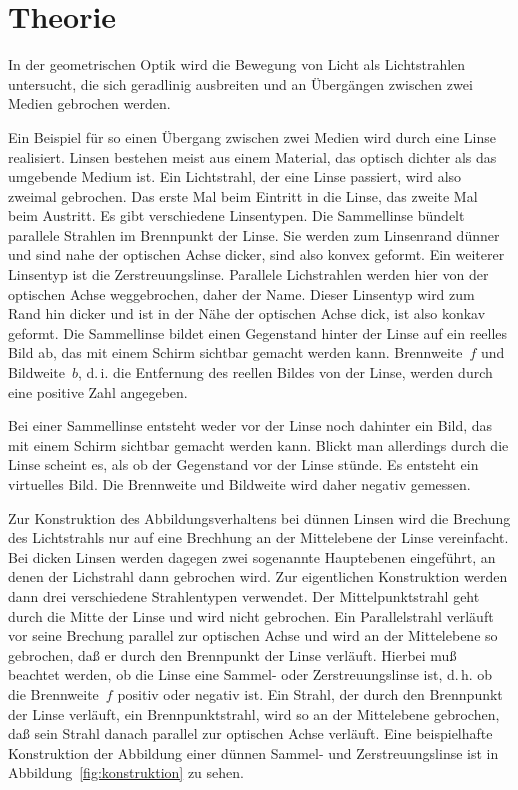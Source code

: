 
\section{Theorie}

In der geometrischen Optik wird die Bewegung von Licht als Lichtstrahlen
untersucht, die sich geradlinig ausbreiten und an Übergängen zwischen
zwei Medien gebrochen werden.

Ein Beispiel für so einen Übergang zwischen zwei Medien wird durch eine
Linse realisiert.  Linsen bestehen meist aus einem Material, das optisch
dichter als das umgebende Medium ist.  Ein Lichtstrahl, der eine Linse
passiert, wird also zweimal gebrochen.  Das erste Mal beim Eintritt in
die Linse, das zweite Mal beim Austritt.  Es gibt verschiedene
Linsentypen.  Die Sammellinse bündelt parallele Strahlen im Brennpunkt
der Linse.  Sie werden zum Linsenrand dünner und sind nahe der optischen
Achse dicker, sind also konvex geformt.  Ein weiterer Linsentyp ist die
Zerstreuungslinse.  Parallele Lichstrahlen werden hier von der optischen
Achse weggebrochen, daher der Name.  Dieser Linsentyp wird zum Rand hin
dicker und ist in der Nähe der optischen Achse dick, ist also konkav
geformt.  Die Sammellinse bildet einen Gegenstand hinter der Linse auf
ein reelles Bild ab, das mit einem Schirm sichtbar gemacht werden
kann. Brennweite~$f$ und Bildweite~$b$, d.\,i. die Entfernung des
reellen Bildes von der Linse, werden durch eine positive Zahl angegeben.

Bei einer Sammellinse entsteht weder vor der Linse noch dahinter ein
Bild, das mit einem Schirm sichtbar gemacht werden kann.  Blickt man
allerdings durch die Linse scheint es, als ob der Gegenstand vor der
Linse stünde.  Es entsteht ein virtuelles Bild.  Die Brennweite und
Bildweite wird daher negativ gemessen.

Zur Konstruktion des Abbildungsverhaltens bei dünnen Linsen wird die
Brechung des Lichtstrahls nur auf eine Brechhung an der Mittelebene der
Linse vereinfacht.  Bei dicken Linsen werden dagegen zwei sogenannte
Hauptebenen eingeführt, an denen der Lichstrahl dann gebrochen wird. Zur
eigentlichen Konstruktion werden dann drei verschiedene Strahlentypen
verwendet.  Der Mittelpunktstrahl geht durch die Mitte der Linse und
wird nicht gebrochen.  Ein Parallelstrahl verläuft vor seine Brechung
parallel zur optischen Achse und wird an der Mittelebene so gebrochen,
daß er durch den Brennpunkt der Linse verläuft. Hierbei muß beachtet
werden, ob die Linse eine Sammel- oder Zerstreuungslinse ist, d.\,h. ob
die Brennweite~$f$ positiv oder negativ ist.  Ein Strahl, der durch den
Brennpunkt der Linse verläuft, ein Brennpunktstrahl, wird so an der
Mittelebene gebrochen, daß sein Strahl danach parallel zur optischen
Achse verläuft.  Eine beispielhafte Konstruktion der Abbildung einer
dünnen Sammel- und Zerstreuungslinse ist in
Abbildung~\vref{fig:konstruktion} zu sehen.

